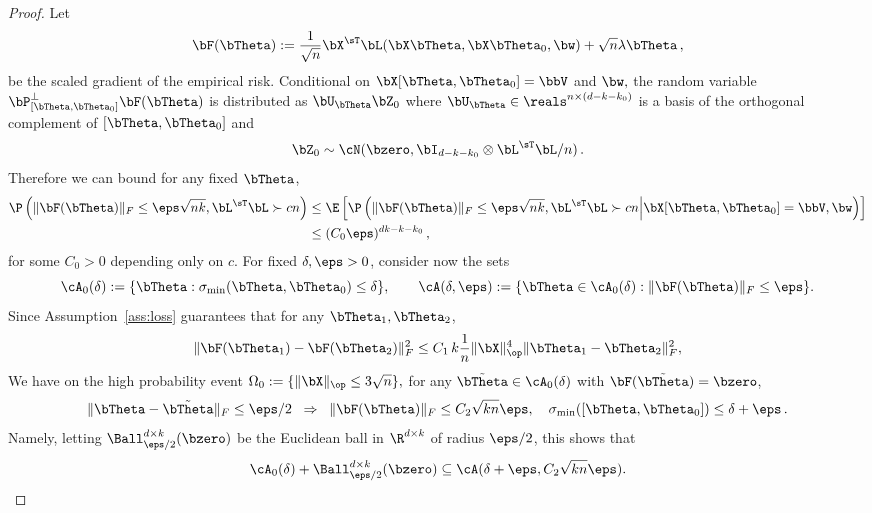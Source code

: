 \begin{proof}
Let
\begin{equation}
    \bF(\bTheta) := \frac1{\sqrt{n}} \bX^\sT \bL(\bX\bTheta,\bX\bTheta_0,\bw) + \sqrt{n}\lambda \bTheta\, ,
\end{equation}
be the scaled gradient of the empirical risk.
Conditional on $\bX[\bTheta,\bTheta_0] = \bbV$ and $\bw,$ the random variable $\bP_{[\bTheta,\bTheta_0]}^\perp\bF(\bTheta)$ is  distributed as $\bU_{\bTheta}\bZ_0$ where  $\bU_{\bTheta}\in\reals^{n\times (d-k-k_0)}$ is a basis of the orthogonal complement of $[\bTheta,\bTheta_0]$
and
\begin{equation}
    \bZ_0 \sim \cN(\bzero, \bI_{d- k - k_0} \otimes \bL^\sT\bL/n)\, .
\end{equation}
Therefore we can bound for any fixed $\bTheta$,
\begin{align}
\label{eq:small_ball_prob}
\P\left( \|\bF(\bTheta)\|_F \le \eps \sqrt{nk} , \bL^\sT\bL \succ c n  \right)
&\le\E\left[\P\left( \|\bF(\bTheta)\|_F \le \eps \sqrt{nk} , \bL^\sT\bL \succ c n  \Big| \bX[\bTheta,\bTheta_0]=\bbV, \bw \right)\right]\\
&\le (C_0 \eps)^{dk - k - k_0}\, ,\nonumber
\end{align}
for some $C_0>0$ depending only on $c$.
For fixed $\delta,\eps >0$, consider now the sets
\begin{equation}
    \cA_0(\delta) := \{\bTheta : \sigma_{\min}(\bTheta,\bTheta_0) \le \delta\},\quad\quad
    \cA(\delta,\eps) := \{\bTheta \in\cA_0(\delta) : \|\bF(\bTheta)\|_F \le \eps\}.
\end{equation}
Since Assumption~\ref{ass:loss} guarantees that for any $\bTheta_1,\bTheta_2$,
\begin{equation}
    \|\bF(\bTheta_1) - \bF(\bTheta_2)\|_F^2 \le C_1 \,k \frac1n \|\bX\|^4_\op  \|\bTheta_1 -\bTheta_2\|_F^2,
\end{equation}
We have on the high probability event $\Omega_0 := \{\|\bX\|_\op \le 3 \sqrt{n}\},$
for any $\tilde\bTheta \in \cA_0(\delta)$ with $\bF(\tilde\bTheta) = \bzero$, 
\begin{equation}
\|\bTheta - \tilde \bTheta\|_F \le \eps/2 \;\;\Rightarrow\;\;
    \|\bF(\bTheta)\|_F  \le C_2 \sqrt{k n} \eps,\quad
\sigma_{\min}([\bTheta,\bTheta_0]) \le \delta + \eps\, .
\end{equation}
Namely, letting $\Ball_{\eps/2}^{d\times k}(\bzero)$ be the Euclidean ball in $\R^{d\times k}$ of radius $\eps/2$, this 
shows that
\begin{equation}
\cA_0(\delta) + \Ball_{\eps/2}^{d\times k}(\bzero)  \subseteq   \cA(\delta + \eps , C_2 \sqrt{k n} \eps).

\end{equation}
\end{proof}
